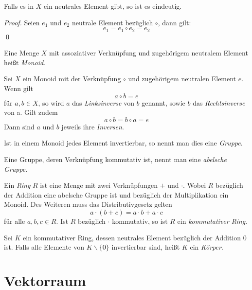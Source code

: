 \begin{claim}
Falls es in $X$ ein neutrales Element gibt, so ist es eindeutig. 
\end{claim}
\begin{proof}
\smartqed
Seien $e_1$ und $e_2$ neutrale Element bezüglich $\circ$, dann gilt: 
\[ e_1 = e_1\circ e_2 = e_2 \] \qed
\end{proof}

\begin{definition}
Eine Menge $X$ mit assoziativer Verknüpfung und zugehörigem neutralem Element heißt \textsl{Monoid}.
\end{definition}

\begin{definition}
Sei $X$ ein Monoid mit der Verknüpfung $\circ$ und zugehörigem neutralen Element $e$. Wenn gilt
\[ a\circ b = e \]
für $a,b \in X$, so wird $a$ das \textsl{Linksinverse} von $b$ genannt, sowie $b$ das \textsl{Rechtsinverse} von a. Gilt zudem
\[ a\circ b = b \circ a = e \]
Dann sind $a$ und $b$ jeweils ihre \textsl{Inversen}.
\end{definition}

\begin{definition}
Ist in einem Monoid jedes Element invertierbar, so nennt man dies eine \textsl{Gruppe}.
\end{definition}

\begin{definition}
Eine Gruppe, deren Verknüpfung kommutativ ist, nennt man eine \textsl{abelsche Gruppe}.
\end{definition}

\begin{definition}
Ein \textsl{Ring} $R$ ist eine Menge mit zwei Verknüpfungen $+$ und $\cdot$. Wobei $R$ bezüglich der Addition eine abelsche Gruppe ist und bezüglich der Multiplikation ein Monoid. Des Weiteren muss das Distributivgesetz gelten
\[ a\cdot (b+c) = a\cdot b + a\cdot c \]
für alle $a,b,c \in R$. Ist $R$ bezüglich $\cdot$ kommutativ, so ist $R$ ein \textsl{kommutativer Ring}.
\end{definition}

\begin{definition}
Sei $K$ ein kommutativer Ring, dessen neutrales Element bezüglich der Addition $0$ ist. Falls alle Elemente von $K\backslash \{0\}$ invertierbar sind, heißt $K$ ein \textsl{Körper}.
\end{definition}

\section{Vektorraum}

